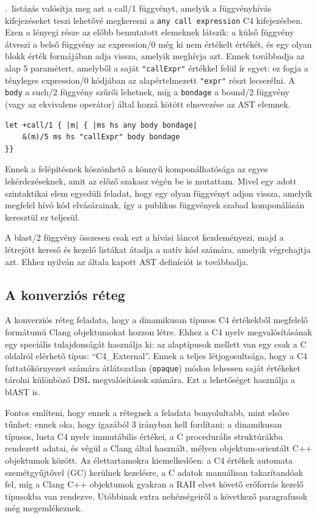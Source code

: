 .~listázás valósítja meg azt a \cfn call/1 függvényt, amelyik a függvényhívás kifejezéseket teszi lehetővé megkeresni \pl a {\tt any call expression} C4 kifejezésben.
Ezen a lényegi része az előbb bemutatott elemeknek látszik: a külső függvény átveszi a belső függvény \pl az \cfn expression/0 még ki nem értékelt értékét, és egy olyan blokk érték formájában adja vissza, amelyik meghívja azt.
Ennek továbbadja az alap 5 paramétert, amelyből a saját {\tt "callExpr"} értékkel felül ír egyet: ez fogja a tényleges \cfn expression/0 kódjában az alapértelmezett {\tt "expr"} részt lecserélni.
A {\tt body} a \cfn such/2 függvény szűrői lehetnek, míg a {\tt bondage} a \cfn bound/2 függvény (vagy az ekvivalens operátor) által hozzá kötött elnevezése az \gls{AST} elemnek.

\begin{lstlisting}[label={lst:blast-call},caption=Példa a blAST \gls{eDSL} megvalósításából]
let +call/1 { |m| { |ms hs any body bondage|
	&(m)/5 ms hs "callExpr" body bondage
}}
\end{lstlisting}

Ennek a felépítésnek köszönhető a könnyű komponálhatósága az egyes lekérdezéseknek, amit az előző szakasz végén be is mutattam.
Mivel egy adott szintaktikai elem egyedüli feladat, hogy egy olyan függvényt adjon vissza, amelyik megfelel hívó kód elvásárainak, így a publikus függvények szabad komponálásán keresztül ez teljesül.

A \cfn blast/2 függvény összesen csak ezt a hívási láncot kezdeményezi, majd a létrejött kereső és kezelő listákat átadja a natív kód számára, amelyik végrehajtja azt.
Ehhez nyilván az általa kapott AST definíciót is továbbadja.

\subsection{A konverziós réteg}

A konverziós réteg feladata, hogy a dinamikusan típusos C4 értékekből megfelelő formátumú Clang objektumokat hozzon létre.
Ehhez a C4 nyelv megvalósításának egy speciális tulajdonságát használja ki: az alaptípusok mellett van egy csak a C oldalról elérhető típus: ``C4\_External''.
Ennek a teljes létjogosultsága, hogy a C4 futtatókörnyezet számára átlátszatlan ({\tt opaque}) módon lehessen saját értékeket tárolni különböző \gls{DSL} megvalósítások számára.
Ezt a lehetőséget használja a blAST is.

Fontos említeni, hogy ennek a rétegnek a feladata bonyolultabb, mint elsőre tűnhet: ennek oka, hogy igazából $3$ irányban kell fordítani: a dinamikusan típusos, lusta C4 nyelv immutábilis értékei, a C procedurális struktúrákba rendezett adatai, és végül a Clang által használt, mélyen objektum-orientált C++ objektumok között.
Az élettartamokra kiemelkedően: a C4 értékek automata szemétgyűjtővel (\gls{GC}) kerülnek kezelésre, a C adatok manuálisan takarítandóak fel, míg a Clang C++ objektumok gyakran a \gls{RAII} elvet követő erőforrás kezelő típusokba van rendezve.
Utóbbinak extra nehézségeiről a következő paragrafusok még megemlékeznek.

